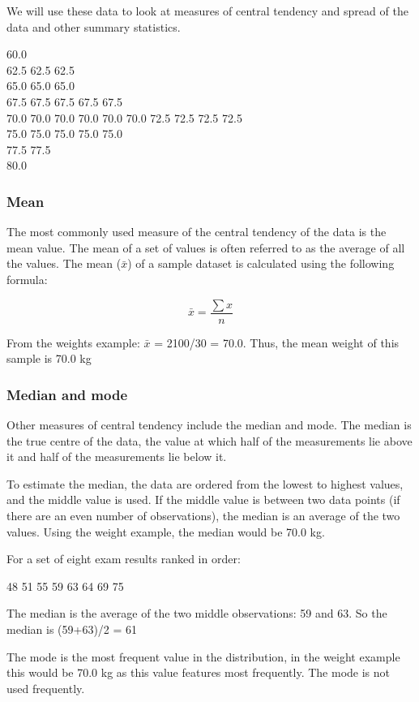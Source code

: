 \documentclass[
]{memoir}
\begin{document}
We will use these data to look at measures of central tendency and spread of the data and other summary statistics.

60.0\\
62.5 62.5 62.5\\
65.0 65.0 65.0\\
67.5 67.5 67.5 67.5 67.5\\
70.0 70.0 70.0 70.0 70.0 70.0
72.5 72.5 72.5 72.5\\
75.0 75.0 75.0 75.0 75.0\\
77.5 77.5\\
80.0

\hypertarget{mean}{%
\subsubsection{Mean}\label{mean}}

The most commonly used measure of the central tendency of the data is the mean value. The mean of a set of values is often referred to as the average of all the values. The mean (\(\bar{x}\)) of a sample dataset is calculated using the following formula:

\[\bar{x} = \frac{\sum x}{n}\]

From the weights example: \(\bar{x}\) = 2100/30 = 70.0. Thus, the mean weight of this sample is 70.0 kg

\hypertarget{median-and-mode}{%
\subsubsection{Median and mode}\label{median-and-mode}}

Other measures of central tendency include the median and mode. The median is the true centre of the data, the value at which half of the measurements lie above it and half of the measurements lie below it.

To estimate the median, the data are ordered from the lowest to highest values, and the middle value is used. If the middle value is between two data points (if there are an even number of observations), the median is an average of the two values.
Using the weight example, the median would be 70.0 kg.

For a set of eight exam results ranked in order:

48 51 55 59 63 64 69 75

The median is the average of the two middle observations: 59 and 63. So the median is (59+63)/2 = 61

The mode is the most frequent value in the distribution, in the weight example this would be 70.0 kg as this value features most frequently. The mode is not used frequently.
\end{document}
